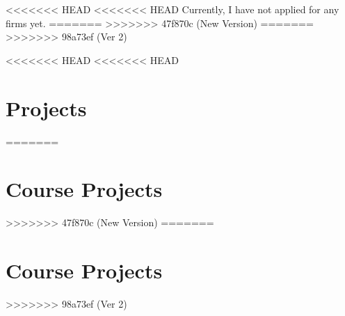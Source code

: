 \documentclass[]{resume-openfont}
\newcommand{\resumeHeading}[4]{\runsubsection{\uppercase{#1}}\descript{ | #2}\hfill\location{#3 | #4}\fakeNewLine}
\newcommand{\projectHeading}[3]{\Project{#1}{#2}
\descript{#3}\\}
\begin{document}

<<<<<<< HEAD
<<<<<<< HEAD
Currently, I have not applied for any firms yet.
=======
>>>>>>> 47f870c (New Version)
=======
>>>>>>> 98a73ef (Ver 2)

<<<<<<< HEAD
<<<<<<< HEAD
\section{Projects}
=======
\section{Course Projects}
>>>>>>> 47f870c (New Version)
=======
\section{Course Projects}
>>>>>>> 98a73ef (Ver 2)

  
\end{document}
